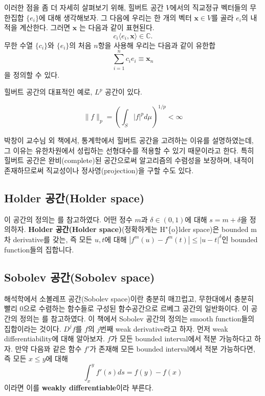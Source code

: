 \documentclass[b5paper,]{scrbook}
\theoremstyle{plain}
\theoremstyle{definition}
\numberwithin{equation}{section}
\begin{document}
이러한 점을 좀 더 자세히 살펴보기 위해, 힐버트 공간 \(V\)에서의 직교정규 벡터들의 무한집합 \(\{ e_{i}\}\)에 대해 생각해보자. 그 다음에 우리는 한 개의 벡터 \(\mathbf{x}\in V\)를 골라 \(e_{i}\)의 내적을 계산한다. 그러면 \(\mathbf{x}\) 는 다음과 같이 표현된다.
\[c_{i}\langle e_{i},\mathbf{x} \rangle \in \mathbb{C}.\]
무한 수열 \(\{c_{i}\}\)와 \(\{e_{i}\}\)의 처음 \(n\)항을 사용해 우리는 다음과 같이 유한합
\[\sum_{i=1}^{n}c_{i}e_{i} \equiv \mathbf{x}_{n}\]
을 정의할 수 있다.

힐버트 공간의 대표적인 예로, \(L^{p}\) 공간이 있다.

\[\| f\|_{p}=(\int_{S}|f|^{p}d\mu)^{1/p}<\infty\]

박창이 교수님 외 책에서, 통계학에서 힐버트 공간을 고려하는 이유를 설명하였는데, 그 이유는 유한차원에서 성립하는 선형대수를 적용할 수 있기 때문이라고 한다. 특히 힐버트 공간은 완비(complete)된 공간으로써 알고리즘의 수렴성을 보장하며, 내적이 존재하므로써 직교성이나 정사영(projection)을 구할 수도 있다.

\hypertarget{holder-holder-space}{%
\subsection{Holder 공간(Holder space)}\label{holder-holder-space}}

이 공간의 정의는 \citep{Wasserman2006}를 참고하였다. 어떤 정수 \(m\)과 \(\delta \in (0,1)\)에 대해 \(s=m+\delta\)을 정의하자. \textbf{Holder 공간(Holder space)}(정확하게는 H"\{o\}lder space)은 bounded m차 derivative를 갖는, 즉 모든 \(u,t\)에 대해 \(|f^{m}(u)-f^{m}(t)|\leq |u-t|^{\delta}\)인 bounded function들의 집합니다.

\hypertarget{sobolev-sobolev-space}{%
\subsection{Sobolev 공간(Sobolev space)}\label{sobolev-sobolev-space}}

해석학에서 소볼레프 공간(Sobolev space)이란 충분히 매끄럽고, 무한대에서 충분히 빨리 0으로 수렴하는 함수들로 구성된 함수공간으로 르베그 공간의 일반화이다. 이 공간의 정의는 \citep{Wasserman2006}를 참고하였다. 이 책에서 Sobolev 공간의 정의는 smooth function들의 집합이라는 것이다. \(D^{j}f\)를 \(f\)의 \(j\)번째 weak derivative라고 하자. 먼저 weak differentiability에 대해 알아보자. \(f\)가 모든 bounded interval에서 적분 가능하다고 하자. 만약 다음꽈 같은 함수 \(f'\)가 존재해 모든 bounded interval에서 적분 가능하다면, 즉 모든 \(x\leq y\)에 대해
\[\int_{x}^{y}f'(s)ds=f(y)-f(x)\]
이라면 이를 \textbf{weakly differentiable}이라 부른다.
\end{document}
